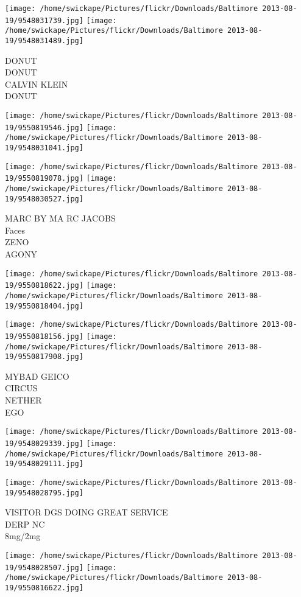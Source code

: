 \documentclass[10pt,letterpaper]{article}
\begin{document}
\texttt{[image: /home/swickape/Pictures/flickr/Downloads/Baltimore 2013-08-19/9548031739.jpg]}
\texttt{[image: /home/swickape/Pictures/flickr/Downloads/Baltimore 2013-08-19/9548031489.jpg]}

DONUT\\
DONUT\\
CALVIN KLEIN\\
DONUT
\pagebreak

\texttt{[image: /home/swickape/Pictures/flickr/Downloads/Baltimore 2013-08-19/9550819546.jpg]}
\texttt{[image: /home/swickape/Pictures/flickr/Downloads/Baltimore 2013-08-19/9548031041.jpg]}

\texttt{[image: /home/swickape/Pictures/flickr/Downloads/Baltimore 2013-08-19/9550819078.jpg]}
\texttt{[image: /home/swickape/Pictures/flickr/Downloads/Baltimore 2013-08-19/9548030527.jpg]}

MARC BY MA RC JACOBS\\
Faces\\
ZENO\\
AGONY
\pagebreak

\texttt{[image: /home/swickape/Pictures/flickr/Downloads/Baltimore 2013-08-19/9550818622.jpg]}
\texttt{[image: /home/swickape/Pictures/flickr/Downloads/Baltimore 2013-08-19/9550818404.jpg]}

\texttt{[image: /home/swickape/Pictures/flickr/Downloads/Baltimore 2013-08-19/9550818156.jpg]}
\texttt{[image: /home/swickape/Pictures/flickr/Downloads/Baltimore 2013-08-19/9550817908.jpg]}

MYBAD GEICO\\
CIRCUS\\
NETHER\\
EGO
\pagebreak

\texttt{[image: /home/swickape/Pictures/flickr/Downloads/Baltimore 2013-08-19/9548029339.jpg]}
\texttt{[image: /home/swickape/Pictures/flickr/Downloads/Baltimore 2013-08-19/9548029111.jpg]}

\vspace{0.25in}
\texttt{[image: /home/swickape/Pictures/flickr/Downloads/Baltimore 2013-08-19/9548028795.jpg]}

VISITOR DGS DOING GREAT SERVICE\\
DERP NC\\
8mg/2mg
\pagebreak

\texttt{[image: /home/swickape/Pictures/flickr/Downloads/Baltimore 2013-08-19/9548028507.jpg]}
\texttt{[image: /home/swickape/Pictures/flickr/Downloads/Baltimore 2013-08-19/9550816622.jpg]}
\end{document}
